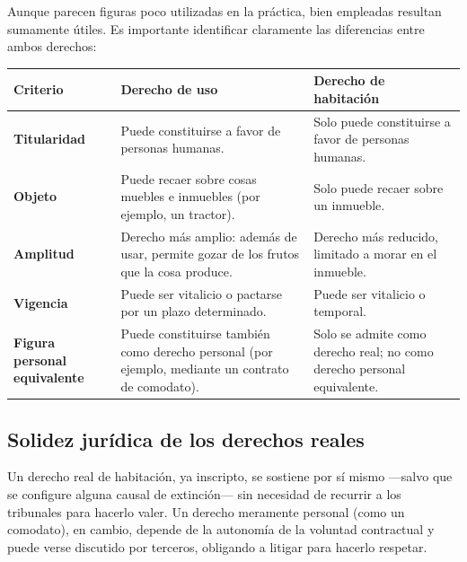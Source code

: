 \documentclass[12pt,oneside]{book}
\begin{document}
Aunque parecen figuras poco utilizadas en la práctica, bien empleadas resultan sumamente útiles. Es importante identificar claramente las diferencias entre ambos derechos:

\begin{table}[H]
\centering
\small
\begin{tabularx}{\textwidth}{
    >{\raggedright\arraybackslash}p{}
    >{\raggedright\arraybackslash}X
    >{\raggedright\arraybackslash}X
}
\toprule
\textbf{Criterio} & \textbf{Derecho de uso} & \textbf{Derecho de habitación} \\
\midrule

\textbf{Titularidad} & Puede constituirse a favor de personas humanas. & Solo puede constituirse a favor de personas humanas. \\

\textbf{Objeto} & Puede recaer sobre cosas muebles e inmuebles (por ejemplo, un tractor). & Solo puede recaer sobre un inmueble. \\

\textbf{Amplitud} & Derecho más amplio: además de usar, permite gozar de los frutos que la cosa produce. & Derecho más reducido, limitado a morar en el inmueble. \\

\textbf{Vigencia} & Puede ser vitalicio o pactarse por un plazo determinado. & Puede ser vitalicio o temporal. \\

\textbf{Figura personal equivalente} & Puede constituirse también como derecho personal (por ejemplo, mediante un contrato de comodato). & Solo se admite como derecho real; no como derecho personal equivalente. \\

\bottomrule
\end{tabularx}
\end{table}

\subsection{Solidez jurídica de los derechos reales}

Un derecho real de habitación, ya inscripto, se sostiene por sí mismo ---salvo que se configure alguna causal de extinción--- sin necesidad de recurrir a los tribunales para hacerlo valer. Un derecho meramente personal (como un comodato), en cambio, depende de la autonomía de la voluntad contractual y puede verse discutido por terceros, obligando a litigar para hacerlo respetar.
\end{document}
